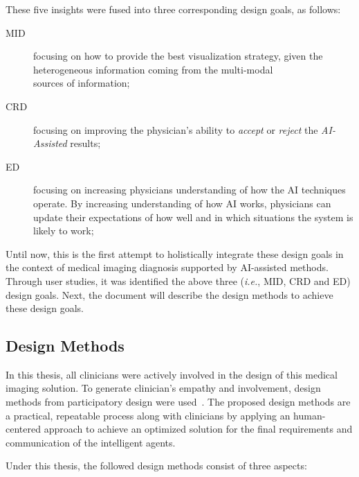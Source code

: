 \hfill

\noindent
These five insights were fused into three corresponding design goals, as follows:

\begin{description}
\item[\ac{MID}] focusing on how to provide the best visualization strategy, given the heterogeneous information coming from the multi-modal \\ sources of information;

\item[\ac{CRD}] focusing on improving the physician's ability to {\it accept} or {\it reject} the {\it AI-Assisted} results;

\item[\ac{ED}] focusing on increasing physicians understanding of how the AI techniques operate. By increasing understanding of how AI works, physicians can update their expectations of how well and in which situations the system is likely to work;
\end{description}

\hfill

Until now, this is the first attempt to holistically integrate these design goals in the context of medical imaging diagnosis supported by \ac{AI}-assisted methods.
Through user studies, it was identified the above three ({\it i.e.}, \ac{MID}, \ac{CRD} and \ac{ED}) design goals.
Next, the document will describe the design methods to achieve these design goals.

\subsection{Design Methods}
\label{sec:sec005003003}

In this thesis, all clinicians were actively involved in the design of this medical imaging solution.
To generate clinician's empathy and involvement, design methods from participatory design were used~\cite{10.1145/3308558.3314123}.
The proposed design methods are a practical, repeatable process along with clinicians by applying an human-centered approach to achieve an optimized solution for the final requirements and communication of the intelligent agents.

\hfill

\noindent
Under this thesis, the followed design methods consist of three aspects:

